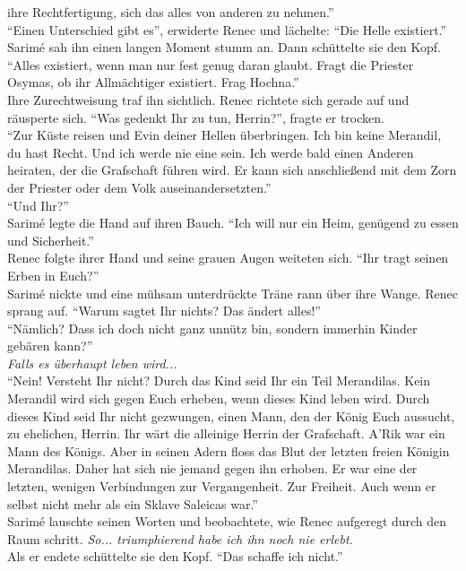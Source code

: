 ihre Rechtfertigung, sich das alles von anderen zu nehmen.''\\
``Einen Unterschied gibt es'', erwiderte Renec und lächelte: ``Die Helle existiert.''\\
Sarimé sah ihn einen langen Moment stumm an. Dann schüttelte sie den Kopf. ``Alles existiert, wenn 
man nur fest genug daran glaubt. Fragt die Priester Osymas, ob ihr Allmächtiger existiert. Frag 
Hochna.''\\
Ihre Zurechtweisung traf ihn sichtlich. Renec richtete sich gerade auf und räusperte sich. ``Was 
gedenkt Ihr zu tun, Herrin?'', fragte er trocken.\\
``Zur Küste reisen und Evin deiner Hellen überbringen. Ich bin keine Merandil, du hast Recht. Und 
ich werde nie eine sein. Ich werde bald einen Anderen heiraten, der die Grafschaft führen wird. Er 
kann sich anschließend mit dem Zorn der Priester oder dem Volk auseinandersetzten.''\\
``Und Ihr?''\\
Sarimé legte die Hand auf ihren Bauch. ``Ich will nur ein Heim, genügend zu essen und 
Sicherheit.''\\
Renec folgte ihrer Hand und seine grauen Augen weiteten sich. ``Ihr tragt seinen Erben in Euch?''\\
Sarimé nickte und eine mühsam unterdrückte Träne rann über ihre Wange. Renec sprang auf. ``Warum 
sagtet Ihr nichts? Das ändert alles!''\\
``Nämlich? Dass ich doch nicht ganz unnütz bin, sondern immerhin Kinder gebären kann?''\\
\textit{Falls es überhaupt leben wird...}\\
``Nein! Versteht Ihr nicht? Durch das Kind seid Ihr ein Teil Merandilas. Kein Merandil wird sich 
gegen Euch erheben, wenn dieses Kind leben wird. Durch dieses Kind seid Ihr nicht gezwungen, einen 
Mann, den der König Euch aussucht, zu ehelichen, Herrin. Ihr wärt die alleinige Herrin der 
Grafschaft. A'Rik war ein Mann des Königs. Aber in seinen Adern floss das Blut der letzten freien 
Königin Merandilas. Daher hat sich nie jemand gegen ihn erhoben. Er war eine der letzten, wenigen 
Verbindungen zur Vergangenheit. Zur Freiheit. Auch wenn er selbst nicht mehr als ein Sklave 
Saleicas war.''\\
Sarimé lauschte seinen Worten und beobachtete, wie Renec aufgeregt durch den Raum schritt. 
\textit{So... triumphierend habe ich ihn noch nie erlebt.}\\
Als er endete schüttelte sie den Kopf. ``Das schaffe ich nicht.''\\
